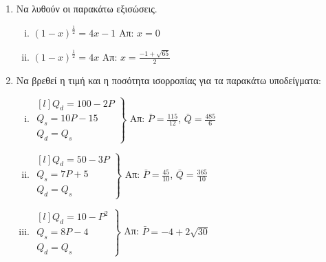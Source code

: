 




\everymath{\displaystyle}
\pagestyle{askhseis}




\begin{center}
  \minibox{\large\bfseries \textcolor{Col1}{Ασκήσεις Επανάληψης}}
\end{center}

\vspace{\baselineskip}


\begin{enumerate}

  \item Να λυθούν οι παρακάτω εξισώσεις.

    \begin{enumerate}[i)]
      \item $ (1-x)^{\frac{1}{2}} = 4x-1 $ \hfill Απ: $ x=0 $
      \item $ (1-x)^{\frac{1}{2}} = 4x $ \hfill Απ: $ x = \frac{-1+ \sqrt{65}}{2} $ 
    \end{enumerate}

  \item Να βρεθεί η τιμή και η ποσότητα ισορροπίας για τα παρακάτω υποδείγματα:

    \begin{enumerate}[i)]
      \item 
        $ \left.
          \begin{matrix*}[l]
            Q_{d} = 100 - 2P \\
            Q_{s} = 10P-15 \\
            Q_{d}=Q_{s}
          \end{matrix*} 
        \right\}$ 
        \hfill Απ: $ \bar{P} = \frac{115}{12} $, $ \bar{Q} = \frac{485}{6} $

      \item  
        $ 
        \left.
          \begin{matrix*}[l]
            Q_{d} = 50 - 3P \\
            Q_{s}=7P+5 \\
            Q_{d}=Q_{s}
          \end{matrix*} 
        \right\}$
        \hfill Απ: $ \bar{P} = \frac{45}{10} $, $ \bar{Q} = \frac{365}{10} $ 

      \item 
        $ 
        \left.
          \begin{matrix*}[l]
            Q_{d}=10-P^{2} \\
            Q_{s}=8P-4 \\
            Q_{d}=Q_{s}
          \end{matrix*} 
        \right\}$
        \hfill Απ: $ \bar{P}=-4+2 \sqrt{30} $   


\end{enumerate}
\end{enumerate}
